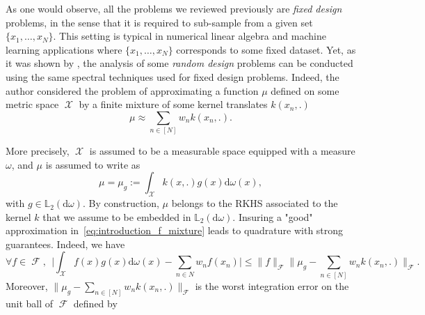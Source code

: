 \documentclass[twoside,11pt]{book}
\numberwithin{theorem}{chapter}
\numberwithin{definition}{chapter}
\numberwithin{proposition}{chapter}
\numberwithin{corollary}{chapter}
\numberwithin{example}{chapter}
\numberwithin{lemma}{chapter}
\numberwithin{assumption}{chapter}
\numberwithin{equation}{chapter}
\numberwithin{figure}{chapter}
\DeclareMathOperator{\F}{\mathcal{F}}
\DeclareMathOperator{\X}{\mathcal{X}}
\begin{document}




As one would observe, all the problems we reviewed previously are \emph{fixed design} problems, in the sense that it is required to sub-sample from a given set $\{x_{1}, \dots, x_{N}\}$. This setting is typical in numerical linear algebra and machine learning applications where $\{x_{1}, \dots, x_{N}\}$ corresponds to some fixed dataset. Yet, as it was shown by \cite{Bac17}, the analysis of some \emph{random design} problems can be conducted using the same spectral techniques used for fixed design problems. Indeed, the author considered the problem of approximating a function $\mu$ defined on some metric space $\X$ by a finite mixture of some kernel translates $k(x_{n},.)$ 
\begin{equation}\label{eq:introduction_f_mixture}
\mu \approx \sum\limits_{n \in [N]}w_{n}k(x_{n},.).
\end{equation}

More precisely, $\X$ is assumed to be a measurable space equipped with a measure $\omega$, and $\mu$ is assumed to write as
\begin{equation}
\mu = \mu_{g} := \int_{\X}k(x,.)g(x) \mathrm{d}\omega(x),
\end{equation}
with $g \in \mathbb{L}_{2}(\mathrm{d}\omega)$. By construction, $\mu$ belongs to the RKHS associated to the kernel $k$ that we assume to be embedded in $\mathbb{L}_{2}(\mathrm{d}\omega)$. Insuring a "good" approximation in~\eqref{eq:introduction_f_mixture} leads to quadrature with strong guarantees. Indeed, we have
\begin{equation}
\forall f \in \F, \:\: \Big| \int_{\X} f(x)g(x)\mathrm{d}\omega(x) - \sum\limits_{n \in N}w_{n}f(x_{n})  \Big| \leq \|f\|_{\F} \Big\|\mu_{g} - \sum\limits_{n \in [N]} w_{n}k(x_{n},.) \Big\|_{\F}.
\end{equation}
Moreover, $\|\mu_{g} - \sum_{n \in [N]} w_{n}k(x_{n},.) \|_{\F}$ is the worst integration error on the unit ball of $\F$ defined by
\end{document}
